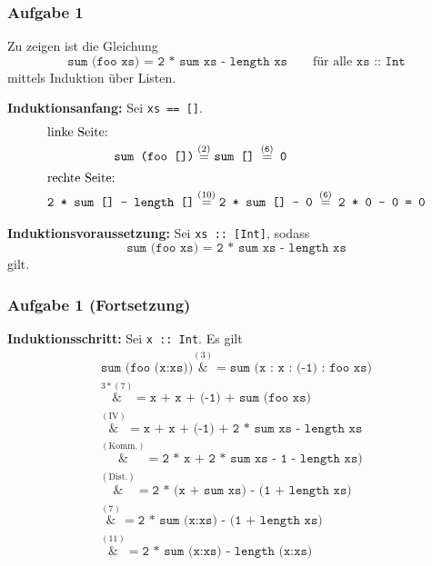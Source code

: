 \documentclass{beamer}
\newcommand{\step}[2][]{\ensuremath{\overset{{#1} (\text{#2})}{=}}}
\newcommand*{\astep}[2][]{\ensuremath{\overset{{#1} (\text{#2})}&{=}}}
\begin{document}
\begin{frame} \frametitle{Aufgabe 1}
	\scriptsize
	Zu zeigen ist die Gleichung
	\begin{equation*}
		\texttt{sum (foo xs) = 2 * sum xs - length xs} \qquad \text{für alle } \texttt{xs :: Int}
	\end{equation*}
	mittels Induktion über Listen.
	
	\textbf{Induktionsanfang:} Sei \texttt{xs == []}. 
	\begin{align*}
		\intertext{linke Seite: }
		\texttt{sum (foo [])} &\step{2} \texttt{sum [] \step{6} 0} \\
		\intertext{rechte Seite: }
		\texttt{2 * sum [] - length []} &\step{10} \texttt{2 * sum [] - 0 \step{6} 2 * 0 - 0 = 0}
	\end{align*}
	
	\textbf{Induktionsvoraussetzung:} Sei \texttt{xs :: [Int]}, sodass
	\begin{equation*}
		\texttt{sum (foo xs) = 2 * sum xs - length xs}
	\end{equation*}
	gilt.
\end{frame}

\begin{frame} \frametitle{Aufgabe 1 (Fortsetzung)}
	\scriptsize
	
	\textbf{Induktionsschritt:} Sei \texttt{x :: Int}. Es gilt
	\begin{align*}
		\texttt{sum (foo (x:xs))} \astep{3} \texttt{sum (x : x : (-1) : foo xs)} \\
		\astep[3*]{7} \texttt{x + x + (-1) + sum (foo xs)} \\
		\astep{IV} \texttt{x + x + (-1) + 2 * sum xs - length xs} \\
		\astep{Komm.} \texttt{2 * x + 2 * sum xs - 1 - length xs)} \\
		\astep{Dist.} \texttt{2 * (x + sum xs) - (1 + length xs)} \\
		\astep{7} \texttt{2 * sum (x:xs) - (1 + length xs)} \\
		\astep{11} \texttt{2 * sum (x:xs) - length (x:xs)} 
	\end{align*}
\end{frame}
\end{document}
